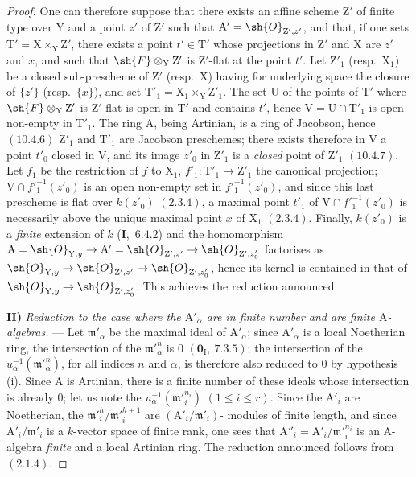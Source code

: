 \begin{proof}
One can therefore suppose that there exists an affine scheme $\mathrm{Z}'$ of finite type over $\mathrm{Y}$ and a
point $z'$ of $\mathrm{Z}'$ such that $\mathrm{A}'=\sh{O}_{\mathrm{Z}',z'}$, and that, if one sets $\mathrm{T}'=\mathrm{X}\times_\mathrm{Y}\mathrm{Z}'$, there exists a point
$t'\in\mathrm{T}'$ whose projections in $\mathrm{Z}'$ and $\mathrm{X}$ are $z'$ and $x$, and such that $\sh{F}\otimes_\mathrm{Y}\mathrm{Z}'$ is $\mathrm{Z}'$-flat at the
point $t'$. Let $\mathrm{Z}'_1$ (resp.\ $\mathrm{X}_1$) be a closed sub-prescheme of $\mathrm{Z}'$ (resp.\ $\mathrm{X}$) having for underlying space
the closure of $\{z'\}$ (resp.\ $\{x\}$), and set $\mathrm{T}'_1=\mathrm{X}_1\times_\mathrm{Y}\mathrm{Z}'_1$. The set $\mathrm{U}$ of the
points of $\mathrm{T}'$ where $\sh{F}\otimes_\mathrm{Y}\mathrm{Z}'$ is $\mathrm{Z}'$-flat is open in $\mathrm{T}'$  and contains $t'$, hence
$\mathrm{V}=\mathrm{U}\cap\mathrm{T}'_1$ is open non-empty in $\mathrm{T}'_1$. The ring $\mathrm{A}$, being Artinian, is a ring of
Jacobson, hence $(10.4.6)$ $\mathrm{Z}'_1$ and $\mathrm{T}'_1$ are Jacobson preschemes; there exists therefore
in $\mathrm{V}$ a point $t'_0$ closed in $\mathrm{V}$, and its image $z'_0$ in $\mathrm{Z}'_1$ is a \emph{closed} point of $\mathrm{Z}'_1$ $(10.4.7)$.
Let $f_1$ be the restriction of $f$ to $\mathrm{X}_1$, $f'_1:\mathrm{T}'_1\to\mathrm{Z}'_1$ the canonical projection; $\mathrm{V}\cap f'^{-1}_1(z'_0)$ is
an open non-empty set in $f'^{-1}_1(z'_0)$, and since this last prescheme is flat over
$k(z'_0)$ $(2.3.4)$, a maximal point $t'_1$ of $\mathrm{V}\cap f'^{-1}_1(z'_0)$ is necessarily above the unique
maximal point $x$ of $\mathrm{X}_1$ $(2.3.4)$. Finally, $k(z'_0)$ is a \emph{finite} extension of $k$ (\textbf{I},~$6.4.2$) and
the homomorphism $\mathrm{A}=\sh{O}_{\mathrm{Y},y}\to\mathrm{A}'=\sh{O}_{\mathrm{Z}',z'}\to\sh{O}_{\mathrm{Z}',z'_0}$ factorises as $\sh{O}_{\mathrm{Y},y}\to\sh{O}_{\mathrm{Z}',z'}\to\sh{O}_{\mathrm{Z}',z'_0}$, hence
its kernel is contained in that of $\sh{O}_{\mathrm{Y},y}\to\sh{O}_{\mathrm{Z}',z'_0}$. This achieves the reduction announced.

\medskip
\noindent\textbf{II)} \emph{Reduction to the case where the $\mathrm{A}'_\alpha$ are in finite number and are finite $\mathrm{A}$-algebras.} --- Let $\mathfrak{m}'_\alpha$ be
the maximal ideal of $\mathrm{A}'_\alpha$; since $\mathrm{A}'_\alpha$ is a local Noetherian ring, the intersection of the $\mathfrak{m}'^n_\alpha$
is $0$ $(\mathbf{0}_\mathrm{I},~7.3.5)$; the intersection of the $u^{-1}_\alpha(\mathfrak{m}'^n_\alpha)$, for all indices $n$ and $\alpha$, is therefore also
reduced to $0$ by hypothesis (i). Since $\mathrm{A}$
is Artinian, there is a finite number of these ideals whose intersection is already $0$; let us note the
$u^{-1}_\alpha(\mathfrak{m}'^{n_i}_i)$ $(1\leq i\leq r)$. Since the $\mathrm{A}'_i$ are Noetherian, the $\mathfrak{m}'^h_i/\mathfrak{m}'^{h+1}_i$ are $(\mathrm{A}'_i/\mathfrak{m}'_i)$-
modules of finite length, and since $\mathrm{A}'_i/\mathfrak{m}'_i$ is a $k$-vector space of finite rank, one
sees that $\mathrm{A}''_i=\mathrm{A}'_i/\mathfrak{m}'^{n_i}_i$ is an $\mathrm{A}$-algebra \emph{finite} and a local Artinian ring. The reduction
announced follows from $(2.1.4)$.


\end{proof}
